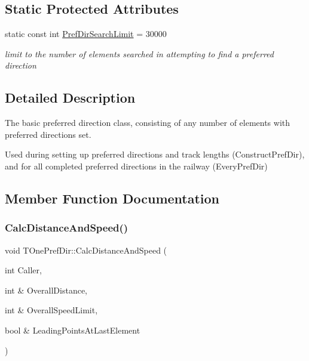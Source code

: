\subsection*{Static Protected Attributes}
\begin{DoxyCompactItemize}
\item 
\mbox{\label{class_t_one_pref_dir_a9fc8032fb9c525951620e7aafa067d45}} 
static const int \mbox{\hyperlink{class_t_one_pref_dir_a9fc8032fb9c525951620e7aafa067d45}{Pref\+Dir\+Search\+Limit}} = 30000
\begin{DoxyCompactList}\small\item\em limit to the number of elements searched in attempting to find a preferred direction \end{DoxyCompactList}\end{DoxyCompactItemize}


\subsection{Detailed Description}
The basic preferred direction class, consisting of any number of elements with preferred directions set.

Used during setting up preferred directions and track lengths (Construct\+Pref\+Dir), and for all completed preferred directions in the railway (Every\+Pref\+Dir) 

\subsection{Member Function Documentation}
\mbox{\label{class_t_one_pref_dir_abadb0c99b24d6dbfda371d96b308fc6e}} 
\subsubsection{\texorpdfstring{Calc\+Distance\+And\+Speed()}{CalcDistanceAndSpeed()}}
{\footnotesize\ttfamily void T\+One\+Pref\+Dir\+::\+Calc\+Distance\+And\+Speed (\begin{DoxyParamCaption}\item[{int}]{Caller,  }\item[{int \&}]{Overall\+Distance,  }\item[{int \&}]{Overall\+Speed\+Limit,  }\item[{bool \&}]{Leading\+Points\+At\+Last\+Element }\end{DoxyParamCaption})}

